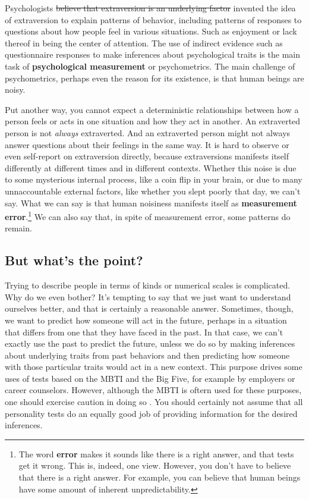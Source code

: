 \documentclass[]{book}
\let\rmarkdownfootnote\footnote%
\def\footnote{\protect\rmarkdownfootnote}
\begin{document}
Psychologists \sout{believe that extraversion is an underlying factor} invented the idea of extraversion to explain patterns of behavior, including patterns of responses to questions about how people feel in various situations. Such as enjoyment or lack thereof in being the center of attention. The use of indirect evidence such as questionnaire responses to make inferences about psychological traits is the main task of \textbf{psychological measurement} or psychometrics. The main challenge of psychometrics, perhaps even the reason for its existence, is that human beings are noisy.

Put another way, you cannot expect a deterministic relationships between how a person feels or acts in one situation and how they act in another. An extraverted person is not \emph{always} extraverted. And an extraverted person might not always answer questions about their feelings in the same way. It is hard to observe or even self-report on extraversion directly, because extraversions manifests itself differently at different times and in different contexts. Whether this noise is due to some mysterious internal process, like a coin flip in your brain, or due to many unnaccountable external factors, like whether you slept poorly that day, we can't say. What we can say is that human noisiness manifests itself as \textbf{measurement error}.\footnote{The word \textbf{error} makes it sounds like there is a right answer, and that tests get it wrong. This is, indeed, one view. However, you don't have to believe that there is a right answer. For example, you can believe that human beings have some amount of inherent unpredictability.} We can also say that, in spite of measurement error, some patterns do remain.

\hypertarget{but-whats-the-point}{%
\subsection{But what's the point?}\label{but-whats-the-point}}

Trying to describe people in terms of kinds or numerical scales is complicated. Why do we even bother? It's tempting to say that we just want to understand ourselves better, and that is certainly a reasonable answer. Sometimes, though, we want to predict how someone will act in the future, perhaps in a situation that differs from one that they have faced in the past. In that case, we can't exactly use the past to predict the future, unless we do so by making inferences about underlying traits from past behaviors and then predicting how someone with those particular traits would act in a new context. This purpose drives some uses of tests based on the MBTI and the Big Five, for example by employers or career counselors. However, although the MBTI is oftern used for these purposes, one should exercise caution in doing so \citep{pittenger1993}. You should certainly not assume that all personality tests do an equally good job of providing information for the desired inferences.
\end{document}
